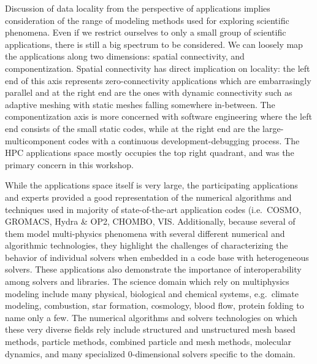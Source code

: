 %
%
$ $\\
\noindent
Discussion of data locality from the perspective of applications implies
consideration of the range of modeling methods used for exploring
scientific phenomena. Even if we restrict ourselves to only a small
group of scientific applications, there is still a big spectrum to be
considered. We can loosely map the applications along two dimensions:
spatial connectivity, and componentization. Spatial connectivity has
direct implication on locality: the left end of this axis represents
zero-connectivity applications which are embarrasingly parallel and at
the right end are the ones with dynamic connectivity such as adaptive
meshing with static meshes falling somewhere in-between. The componentization
axis is more concerned with software engineering where the left end
consists of the small static codes, while at the right end are the
large-multicomponent  codes with a continuous development-debugging
process. The HPC applications space mostly occupies the top right
quadrant, and was the primary concern in this workshop. 

While the applications space itself is very
large, the participating applications and experts provided a good
representation of the numerical algorithms and techniques used in
majority of state-of-the-art application codes (i.e.\ COSMO\cite{cosmo},
GROMACS\cite{gromacs4,gromacs4.5,gromacs-exascale}, Hydra \&
OP2\cite{Hydra, op2}, CHOMBO\cite{chombo}, VIS\cite{vis}. 
Additionally, because several of them model
multi-physics phenomena with several different numerical and
algorithmic technologies, they highlight the challenges of
characterizing the behavior of individual solvers when embedded in a
code base with heterogeneous solvers. %
These applications also demonstrate the importance of interoperability
among solvers and libraries. The science domain which rely on multiphysics modeling
include many physical, biological and chemical systems, e.g.\ climate
modeling, combustion, star formation, cosmology, blood flow, protein
folding to name only a few. The numerical algorithms and solvers
technologies on which these very diverse fields rely include
structured and unstructured mesh based methods, particle methods,
combined particle and mesh methods, molecular dynamics,  and many
specialized 0-dimensional solvers specific to the domain. 

